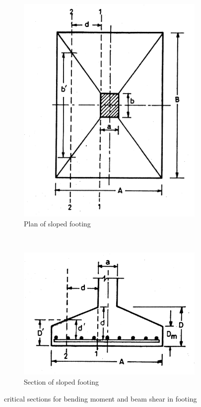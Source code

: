 \begin{figure}
  \centering
  \begin{subfigure}[b]{0.5\textwidth}
    \includegraphics[width=\textwidth]{images/fig2321.png}
    \caption{Plan of sloped footing}
    \label{Planofslopedfooting}
  \end{subfigure}\\
  \begin{subfigure}[b]{0.5\textwidth}
    \includegraphics[width=\textwidth]{images/fig2322.png}
    \caption{Section of sloped footing}
    \label{sectionofslopedfooting}
  \end{subfigure}
\caption{critical sections for bending moment and beam shear in footing}
\label{critical-sections-for-bending-moment-and-beam-shear-in-footing}
\end{figure}%
